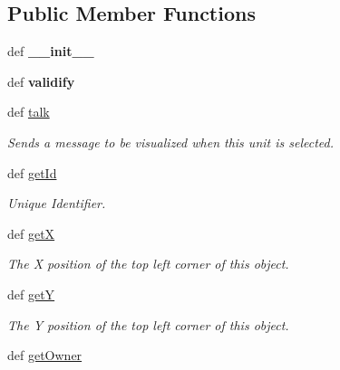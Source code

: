 \subsection*{Public Member Functions}
\begin{DoxyCompactItemize}
\item 
\hypertarget{classGameObject_1_1Frame_a0c7f646fd6d560f543c2e4a42879c746}{
def {\bfseries \_\-\_\-init\_\-\_\-}}
\label{classGameObject_1_1Frame_a0c7f646fd6d560f543c2e4a42879c746}

\item 
\hypertarget{classGameObject_1_1Frame_a3b3469de753098bee40ab13079c0b6ec}{
def {\bfseries validify}}
\label{classGameObject_1_1Frame_a3b3469de753098bee40ab13079c0b6ec}

\item 
\hypertarget{classGameObject_1_1Frame_af6a8745cc68bb4bd36c2f370c1041e93}{
def \hyperlink{classGameObject_1_1Frame_af6a8745cc68bb4bd36c2f370c1041e93}{talk}}
\label{classGameObject_1_1Frame_af6a8745cc68bb4bd36c2f370c1041e93}

\begin{DoxyCompactList}\small\item\em Sends a message to be visualized when this unit is selected. \item\end{DoxyCompactList}\item 
\hypertarget{classGameObject_1_1Frame_a2f554cee1f85539ad4b656a91f1aaf07}{
def \hyperlink{classGameObject_1_1Frame_a2f554cee1f85539ad4b656a91f1aaf07}{getId}}
\label{classGameObject_1_1Frame_a2f554cee1f85539ad4b656a91f1aaf07}

\begin{DoxyCompactList}\small\item\em Unique Identifier. \item\end{DoxyCompactList}\item 
def \hyperlink{classGameObject_1_1Frame_aab513e4859fc8a9f5d5f1a6b47cb6df3}{getX}
\begin{DoxyCompactList}\small\item\em The X position of the top left corner of this object. \item\end{DoxyCompactList}\item 
def \hyperlink{classGameObject_1_1Frame_abf564d6f986b8e9d2a83838691c591f9}{getY}
\begin{DoxyCompactList}\small\item\em The Y position of the top left corner of this object. \item\end{DoxyCompactList}\item 
\hypertarget{classGameObject_1_1Frame_a2b57ecf997ea4cbedfae9cddf4f60fc7}{
def \hyperlink{classGameObject_1_1Frame_a2b57ecf997ea4cbedfae9cddf4f60fc7}{getOwner}}
\label{classGameObject_1_1Frame_a2b57ecf997ea4cbedfae9cddf4f60fc7}


\end{DoxyCompactItemize}
